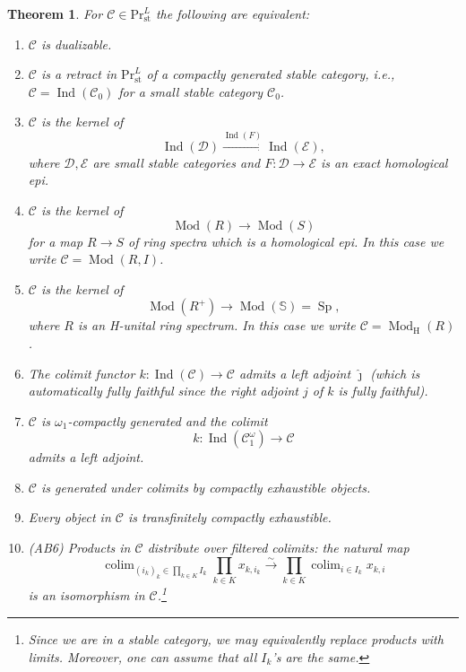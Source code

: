 \documentclass[draft]{amsart}
\renewcommand{\SS}{\mathbb{S}}
\renewcommand{\H}{\mathrm{H}}
\newcommand{\jhat}{\hat\jmath}
\newcommand{\cat}[1]{\mathcal{#1}}
\newcommand{\isoto}{\mathbin{\xrightarrow{\sim}}}
\renewcommand{\Pr}{\mathrm{Pr}}
\DeclareMathOperator{\Ind}{Ind}
\DeclareMathOperator{\Sp}{Sp}
\DeclareMathOperator{\Mod}{Mod}
\DeclareMathOperator*{\colim}{colim}
\newtheorem{thm}{Theorem}[section]
\theoremstyle{definition}
\begin{document}
\begin{thm}\label{Nikolaus:dualizable}
For $\cat C \in \Pr^L_{\mathrm{st}}$ the following are equivalent:
\begin{enumerate}[(1)]
\item $\cat C$ is dualizable.

\item $\cat C$ is a retract in $\Pr^L_{\mathrm{st}}$ of a compactly generated stable category, i.e., $\cat C = \Ind(\cat C_0)$ for a small stable category $\cat C_0$.

\item $\cat C$ is the kernel of 
\[
\Ind(\cat D) \xrightarrow{\Ind(F)} \Ind(\cat E),
\]
where $\cat D, \cat E$ are small stable categories and $F\colon \cat D\to \cat E$ is an exact homological epi.

\item $\cat C$ is the kernel of 
\[
\Mod(R) \to \Mod(S)
\]
for a map $R\to S$ of ring spectra which is a homological epi. In this case we write $\cat C = \Mod(R,I)$.

\item $\cat C$ is the kernel of 
\[
\Mod(R^+) \to \Mod(\SS) = \Sp,
\]
where $R$ is an H-unital ring spectrum. In this case we write $\cat C = \Mod_\H(R)$.

\item The colimit functor $k\colon \Ind(\cat C) \to \cat C$ admits a left adjoint $\jhat$ (which is automatically fully faithful since the right adjoint $j$ of $k$ is fully faithful).

\item $\cat C$ is $\omega_1$-compactly generated and the colimit
\[
k\colon \Ind(\cat C^\omega_1) \to \cat C
\]
admits a left adjoint.

\item $\cat C$ is generated under colimits by compactly exhaustible objects.

\item Every object in $\cat C$ is transfinitely compactly exhaustible.

\item (AB6) Products in $\cat C$ distribute over filtered colimits: the natural map
\[
\colim_{(i_k)_k \in \prod_{k\in K}I_k} \prod_{k\in K} x_{k,i_k} \isoto
\prod_{k\in K} \colim_{i\in I_k} x_{k,i}
\]
is an isomorphism in $\cat C$.\footnote{Since we are in a stable category, we may equivalently replace products with limits. Moreover, one can assume that all $I_k$'s are the same.}
\end{enumerate}
\end{thm}
\end{document}
